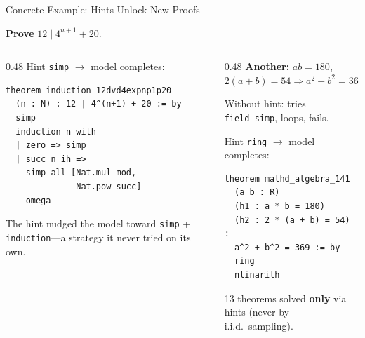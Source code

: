 \documentclass[aspectratio=169, 11pt]{beamer}
\begin{document}
\begin{frame}[fragile]{Concrete Example: Hints Unlock New Proofs}

\textbf{Prove} $12 \mid 4^{n+1} + 20$.

\vspace{0.3em}
\begin{columns}[T]
\begin{column}{0.48\textwidth}
Hint \texttt{simp} $\to$ model completes:
\begin{lstlisting}[style=lean]
theorem induction_12dvd4expnp1p20
  (n : N) : 12 | 4^(n+1) + 20 := by
  simp
  induction n with
  | zero => simp
  | succ n ih =>
    simp_all [Nat.mul_mod,
              Nat.pow_succ]
    omega
\end{lstlisting}
{\scriptsize The hint nudged the model toward \texttt{simp} + \texttt{induction}---a strategy it never tried on its own.}
\end{column}
\begin{column}{0.48\textwidth}
\textbf{Another:} $ab{=}180$, $2(a{+}b){=}54 \Rightarrow a^2{+}b^2{=}369$

\vspace{0.2em}
{\small Without hint: tries \texttt{field\_simp}, loops, fails.}

\vspace{0.2em}
Hint \texttt{ring} $\to$ model completes:
\begin{lstlisting}[style=lean]
theorem mathd_algebra_141
  (a b : R)
  (h1 : a * b = 180)
  (h2 : 2 * (a + b) = 54) :
  a^2 + b^2 = 369 := by
  ring
  nlinarith
\end{lstlisting}

\vspace{0.3em}
{\small 13 theorems solved \textbf{only} via hints (never by i.i.d.\ sampling).}
\end{column}
\end{columns}
\end{frame}
\end{document}
